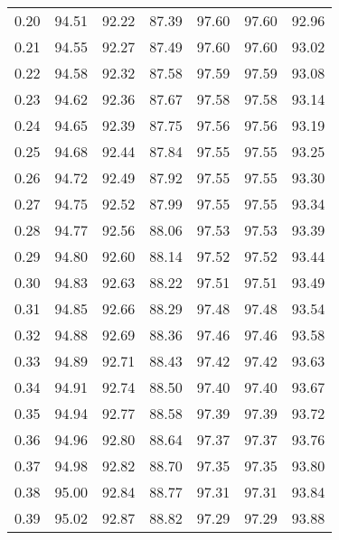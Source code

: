 \begin{tabular}{|c|c|c|c|c|c|c|}
      0.20 &     94.51 &     92.22 &      87.39 &   97.60 &      97.60 &         92.96 \\
      0.21 &     94.55 &     92.27 &      87.49 &   97.60 &      97.60 &         93.02 \\
      0.22 &     94.58 &     92.32 &      87.58 &   97.59 &      97.59 &         93.08 \\
      0.23 &     94.62 &     92.36 &      87.67 &   97.58 &      97.58 &         93.14 \\
      0.24 &     94.65 &     92.39 &      87.75 &   97.56 &      97.56 &         93.19 \\
      0.25 &     94.68 &     92.44 &      87.84 &   97.55 &      97.55 &         93.25 \\
      0.26 &     94.72 &     92.49 &      87.92 &   97.55 &      97.55 &         93.30 \\
      0.27 &     94.75 &     92.52 &      87.99 &   97.55 &      97.55 &         93.34 \\
      0.28 &     94.77 &     92.56 &      88.06 &   97.53 &      97.53 &         93.39 \\
      0.29 &     94.80 &     92.60 &      88.14 &   97.52 &      97.52 &         93.44 \\
      0.30 &     94.83 &     92.63 &      88.22 &   97.51 &      97.51 &         93.49 \\
      0.31 &     94.85 &     92.66 &      88.29 &   97.48 &      97.48 &         93.54 \\
      0.32 &     94.88 &     92.69 &      88.36 &   97.46 &      97.46 &         93.58 \\
      0.33 &     94.89 &     92.71 &      88.43 &   97.42 &      97.42 &         93.63 \\
      0.34 &     94.91 &     92.74 &      88.50 &   97.40 &      97.40 &         93.67 \\
      0.35 &     94.94 &     92.77 &      88.58 &   97.39 &      97.39 &         93.72 \\
      0.36 &     94.96 &     92.80 &      88.64 &   97.37 &      97.37 &         93.76 \\
      0.37 &     94.98 &     92.82 &      88.70 &   97.35 &      97.35 &         93.80 \\
      0.38 &     95.00 &     92.84 &      88.77 &   97.31 &      97.31 &         93.84 \\
      0.39 &     95.02 &     92.87 &      88.82 &   97.29 &      97.29 &         93.88 \\

\end{tabular}
